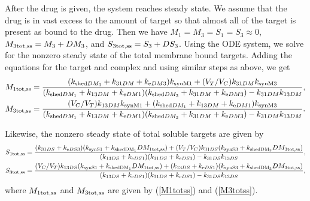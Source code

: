 After the drug is given, the system reaches steady state. We assume that the drug is in vast excess to the amount of target so that almost all of the target is present as bound to the drug. Then we have $M_1 = M_3 = S_1 = S_3 \approx 0$, $M_{3\text{tot,ss}} = M_3 + DM_3$,  and $S_{3\text{tot,ss}} = S_3 + DS_3$. Using the ODE system, we solve for the nonzero steady state of the total membrane bound targets. Adding the equations for the target and complex and using similar steps as above, we get
\begin{align}
M_{1\text{tot,ss}} & = \frac{(k_{\text{shed}DM_3} + k_{31DM} + k_{\text{e} DM3})k_{\text{synM}1} + (V_{T}/V_{C})k_{31DM}k_{\text{synM}3}}   {(k_{\text{shed}DM_1} + k_{13DM} + k_{\text{e} DM1})(k_{\text{shed}DM_3} + k_{31DM} + k_{\text{e} DM3}) - k_{31DM}k_{13DM}}, \label{M1totss}\\
M_{3\text{tot,ss}} & = \frac{(V_{C}/V_{T})k_{13DM}k_{\text{synM}1} + (k_{\text{shed}DM_1} + k_{13DM} + k_{\text{e} DM1})k_{\text{synM}3}}   {(k_{\text{shed}DM_1} + k_{13DM} + k_{\text{e} DM1})(k_{\text{shed}DM_3} + k_{31DM} + k_{\text{e} DM3}) - k_{31DM}k_{13DM}}. \label{M3totss}
\end{align}

Likewise, the nonzero steady state of total soluble targets are given by
\begin{align}
S_{1\text{tot,ss}} & = \frac{(k_{31DS} + k_{\text{e} DS3})(k_{\text{synS}1} + k_{\text{shedDM}_1}DM_{1\text{tot,ss}}) + (V_{T}/V_{C})k_{31DS}(k_{\text{synS}3} + k_{\text{shedDM}_3}DM_{3\text{tot,ss}})}   {(k_{13DS} + k_{\text{e} DS1})(k_{31DS} + k_{\text{e} DS3}) - k_{31DS}k_{13DS}}, \label{S1totss}\\
S_{3\text{tot,ss}} & = \frac{(V_{C}/V_{T})k_{13DS}(k_{\text{synS}1} + k_{\text{shedDM}_1}DM_{1\text{tot,ss}}) + (k_{13DS} + k_{\text{e} DS1})(k_{\text{synS}3} + k_{\text{shedDM}_3}DM_{3\text{tot,ss}})}   {(k_{13DS} + k_{\text{e} DS1})(k_{31DS} + k_{\text{e} DS3}) - k_{31DS}k_{13DS}}, \label{S3totss}
\end{align}
where $M_{1\text{tot,ss}}$ and $M_{3\text{tot,ss}}$ are given by (\ref{M1totss}) and (\ref{M3totss}).

